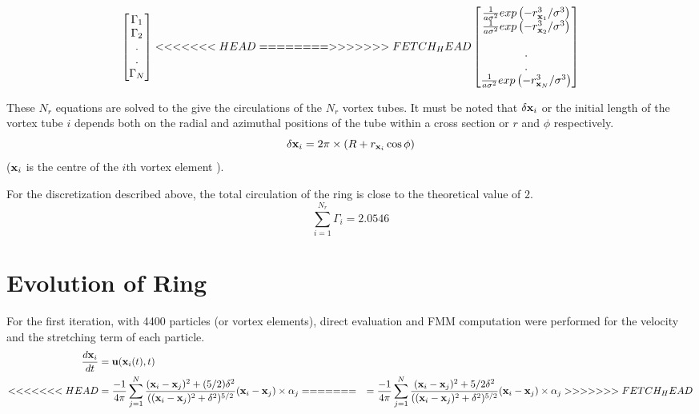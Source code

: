 \documentclass[10pt,a4paper]{report}
\newcommand{\xv}{{\bf x}}
\newcommand{\uv}{{\bf u}}
\begin{document}
\begin{dmath}
\begin{bmatrix}
\Gamma_1 \\
\Gamma_2 \\
. \\
. \\
\Gamma_N
\end{bmatrix}
<<<<<<< HEAD
=
=======
>>>>>>> FETCH_HEAD
\begin{bmatrix}
\frac{1}{a\sigma^2} exp\left(-r_{\xv_1}^3/\sigma^3\right) \\
\frac{1}{a\sigma^2} exp\left(-r_{\xv_2}^3/\sigma^3\right) \\ \\
. \\
. \\
\frac{1}{a\sigma^2} exp\left(-r_{\xv_N}^3/\sigma^3\right) \\
\end{bmatrix}
\end{dmath}

These $N_r$ equations are solved to the give the circulations of the $N_r$ vortex tubes.
It must be noted that $\delta \xv_i $ or the initial length of the vortex tube $i$ depends both on the radial and azimuthal positions of the tube within a cross section or $r$ and $\phi$ respectively.
\begin{equation}
\delta \xv_i = 2 \pi \times ( R + r_{\xv_i} \cos \phi ) 
\end{equation}
($ \xv_i $ is the centre of the $i$th vortex element ).

For the discretization described above, the total circulation of the ring is close to the theoretical value of $2$.
\begin{equation}
\sum_{i=1}^{N_r} \Gamma_i = 2.0546 
\end{equation}

\section{Evolution of Ring}
For the first iteration, with 4400 particles (or vortex elements), direct evaluation and FMM computation were performed for the velocity and the stretching term of each particle.
\begin{align}
\frac{d\xv_i}{dt} &= \uv(\xv_i(t),t) \\
<<<<<<< HEAD
				&=  \frac{-1}{4\pi} \displaystyle \sum_{j=1}^{N} \frac{(\xv_i - \xv_j)^2 + (5/2) \delta^2}{((\xv_i - \xv_j)^2 + \delta^2)^{5/2}} (\xv_i - \xv_j) \times \alpha_j
=======
				&=  \frac{-1}{4\pi} \displaystyle \sum_{j=1}^{N} \frac{(\xv_i - \xv_j)^2 + 5/2 \delta^2}{((\xv_i - \xv_j)^2 + \delta^2)^{5/2}} (\xv_i - \xv_j) \times \alpha_j
>>>>>>> FETCH_HEAD
\end{align}
\end{document}
